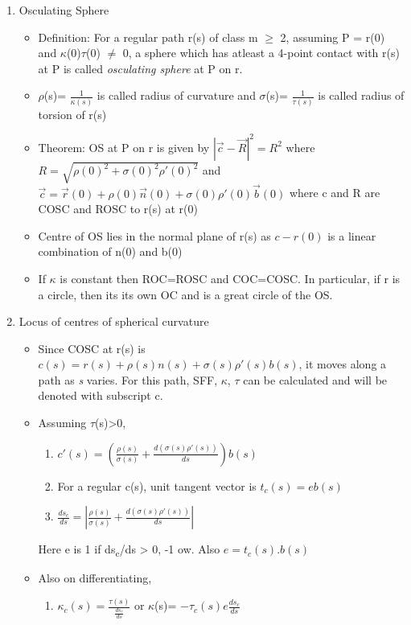 \documentclass[11pt]{article}
\begin{document}
\begin{enumerate}
\begin{itemize}
\end{itemize}
\item Osculating Sphere
\label{sec:org7ad2fc0}
\begin{itemize}
\item Definition: For a regular path r(s) of class m \(\ge\) 2, assuming P = r(0) and \(\kappa\)(0)\(\tau\)(0) \(\neq\) 0, a sphere which has atleast a 4-point contact with r(s) at P is called \emph{osculating sphere} at P on r.
\item \(\rho\)(s)= \(\frac{1}{\kappa(s)}\) is called radius of curvature and \(\sigma\)(s)= \(\frac{1}{\tau(s)}\) is called radius of torsion of r(s)
\item Theorem: OS at P on r is given by \(|\vec{c}-\vec{R}|^{2} = R^{2}\) where \(R = \sqrt{\rho(0)^{2}+\sigma(0)^{2}\rho'(0)^{2}}\) and \(\vec{c}=\vec{r}(0)+\rho(0)\vec{n}(0)+\sigma(0)\rho'(0)\vec{b}(0)\) where c and R are COSC and ROSC to r(s) at r(0)
\item Centre of OS lies in the normal plane of r(s) as \(c-r(0)\) is a linear combination of n(0) and b(0)
\item If \(\kappa\) is constant then ROC=ROSC and COC=COSC. In particular, if r is a circle, then its its own OC and is a great circle of the OS.
\end{itemize}
\item Locus of centres of spherical curvature
\label{sec:org59b10d4}
\begin{itemize}
\item Since COSC at r(s) is \(c(s) =r(s)+\rho(s)n(s)+\sigma(s)\rho'(s)b(s)\), it moves along a path as \emph{s} varies. For this path, SFF, \(\kappa\), \(\tau\) can be calculated and will be denoted with subscript c.
\item Assuming \(\tau\)(s)>0,
\begin{enumerate}
\item \(c'(s) = (\frac{\rho(s)}{\sigma(s)}+ \frac{d (\sigma(s)\rho'(s))}{ds})b(s)\)
\item For a regular c(s), unit tangent vector is \(t_{c}(s) = eb(s)\)
\item \(\frac{ds_{c}}{ds}=|\frac{\rho(s)}{\sigma(s)}+\frac{d(\sigma(s)\rho'(s))}{ds}|\)
\end{enumerate}
Here e is 1 if ds\textsubscript{c}/ds > 0, -1 ow. Also \(e = t_{c}(s).b(s)\)
\item Also on differentiating,
\begin{enumerate}
\item \(\kappa_{c}(s) = \frac{\tau(s)}{\frac{ds_{c}}{ds}}\) or \(\kappa\)(s)= \(-\tau_{c}(s)e \frac{ds_{c}}{ds}\)

\end{enumerate}
\end{itemize}
\end{enumerate}
\end{document}
